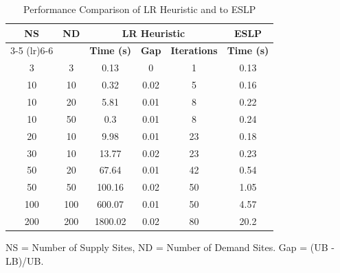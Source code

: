 \begin{table}[h]
    \centering
    \caption{Performance Comparison of LR Heuristic and to ESLP}
    \label{tab:uk_performance}
    \renewcommand{\arraystretch}{1.2}
    \setlength{\tabcolsep}{10pt} %
    
    \begin{tabular}{cc ccc c}
        \toprule
        \textbf{NS} & \textbf{ND} & \multicolumn{3}{c}{\textbf{LR Heuristic}} & \multicolumn{1}{c}{\textbf{ESLP}} \\
        \cmidrule(lr){3-5} \cmidrule(lr){6-6}
         & & \textbf{Time (s)} & \textbf{Gap} & \textbf{Iterations}& \textbf{Time (s)} \\
        \midrule
        3 & 3 & 0.13 & 0 & 1 & 0.13 \\
        10 & 10 & 0.32 & 0.02 & 5 & 0.16\\
        10 & 20 & 5.81 & 0.01 & 8 & 0.22 \\
        10 & 50 & 0.3 & 0.01 & 8 & 0.24\\
        20 & 10 & 9.98  & 0.01 & 23 & 0.18\\
        30 & 10 & 13.77  & 0.02 & 23 & 0.23\\
        50 & 20 & 67.64 & 0.01 & 42 & 0.54 \\
        50 & 50 & 100.16 & 0.02 & 50 & 1.05 \\
        100 & 100 & 600.07& 0.01 & 50 & 4.57 \\
        200 & 200 & 1800.02 & 0.02 & 80 & 20.2 \\

        \bottomrule
    \end{tabular}

    \vspace{5pt}
    \footnotesize NS = Number of Supply Sites, ND = Number of Demand Sites. 
    Gap = (UB - LB)/UB.
\end{table}


